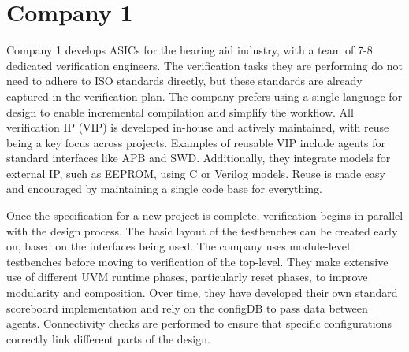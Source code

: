 \section{Company 1} %

Company 1 develops ASICs for the hearing aid industry, with a team of 7-8 dedicated verification engineers. The
verification tasks they are performing do not need to adhere to ISO standards directly, but these standards are
already captured in the verification plan. The company prefers using a single language for design to enable
incremental compilation and simplify the workflow. All verification IP (VIP) is developed in-house and actively
maintained, with reuse being a key focus across projects. Examples of reusable VIP include agents for standard interfaces like
APB and SWD. Additionally, they integrate models for external IP, such as EEPROM, using C or Verilog models. Reuse is
made easy and encouraged by maintaining a single code base for everything.

Once the specification for a new project is complete, verification begins in parallel with the design process. The
basic layout of the testbenches can be created early on, based on the interfaces being used. The company uses
module-level testbenches before moving to verification of the top-level. They make extensive use of different UVM
runtime phases, particularly reset phases, to improve modularity and composition. Over time, they have developed
their own standard scoreboard implementation and rely on the configDB to pass data between agents. Connectivity
checks are performed to ensure that specific configurations correctly link different parts of the design.

